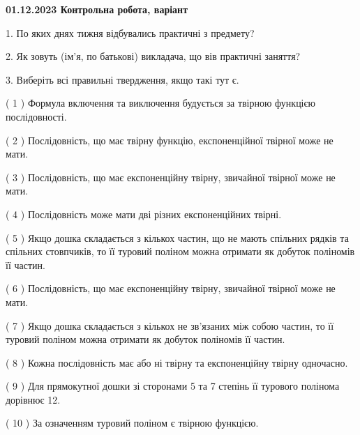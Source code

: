 \documentclass[12pt, ukrainian]{article}
\begin{document}
\vspace{4mm}
\newpage
\begin {large}

\textbf{01.12.2023 Контрольна робота, варіант  }\par


{
1. По яких днях тижня відбувались практичні з предмету?



\vspace{5mm}
2. Як зовуть (ім'я, по батькові) викладача, що вів практичні заняття?



\vspace{5mm}
3. Виберіть всі правильні твердження, якщо такі тут є.\par
\vspace{2mm}
( 1 ) Формула включення та виключення будується за твірною функцією послідовності.%

( 2 ) Послідовність, що має твірну функцію, експоненційної твірної може не мати.%

( 3 ) Послідовність, що має експоненційну твірну, звичайної твірної може не мати.%

( 4 ) Послідовність може мати дві різних експоненційних твірні.%

( 5 ) Якщо дошка складається з кількох частин, що не мають спільних рядків та спільних стовпчиків, то її туровий поліном можна отримати як добуток поліномів її частин.%

( 6 ) Послідовність, що має експоненційну твірну, звичайної твірної може не мати.%

( 7 ) Якщо дошка складається з кількох не зв’язаних між собою частин, то її туровий поліном можна отримати як добуток поліномів її частин.%

( 8 ) Кожна послідовність має або ні твірну та експоненційну твірну одночасно.%

( 9 ) Для прямокутної дошки зі сторонами 5 та 7 степінь її турового полінома дорівнює 12.%

( 10 ) За означенням туровий поліном є твірною функцією.%
}
\end {large}
\end{document}
